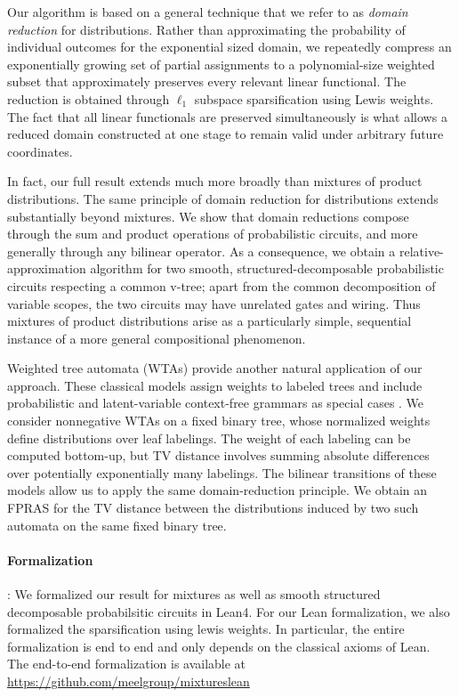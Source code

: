 \documentclass{article}
\begin{document}
Our algorithm is based on a general technique that we refer to as 
\emph{domain reduction} for distributions. 
Rather than approximating the probability of
individual outcomes for the exponential sized domain, we repeatedly compress an exponentially growing set
of partial assignments to a polynomial-size weighted subset that
approximately preserves every relevant linear functional. 
The reduction is obtained through $\ell_1$ subspace sparsification using Lewis weights.
The fact that all linear functionals are preserved simultaneously is what
allows a reduced domain constructed at one stage to remain valid under
arbitrary future coordinates.

In fact, our full result extends much more broadly than mixtures of product distributions.  
The same principle of domain reduction for distributions extends substantially beyond mixtures. 
We show that domain reductions compose through the sum and product operations of
probabilistic circuits, and more generally through any bilinear operator. 
As a consequence, we obtain a
relative-approximation algorithm for two smooth, structured-decomposable
probabilistic circuits respecting a common v-tree; apart from the common
decomposition of variable scopes, the two circuits may have unrelated
gates and wiring. 
Thus mixtures of product distributions arise as a
particularly simple, sequential instance of a more general compositional phenomenon.

Weighted tree automata (WTAs) provide another natural application of
our approach. These classical models assign weights to labeled trees
and include probabilistic and latent-variable context-free grammars
as special cases \cite{FulopVogler09,RabusseauBalleCohen16}.
We consider nonnegative WTAs on a fixed binary tree, whose normalized
weights define distributions over leaf labelings. The weight of each
labeling can be computed bottom-up, but TV distance involves summing
absolute differences over potentially exponentially many labelings.
The bilinear transitions of these models allow us to apply the same
domain-reduction principle. We obtain an FPRAS for the TV distance
between the distributions induced by two such automata on the same
fixed binary tree.

\paragraph{Formalization}: We formalized our result for mixtures as well as smooth structured decomposable probabilsitic circuits in Lean4. For our Lean formalization, we also formalized the sparsification using lewis weights. In particular, the entire formalization is end to end and only depends on the classical axioms of Lean. The end-to-end formalization is available at \url{https://github.com/meelgroup/mixtureslean}
\end{document}
